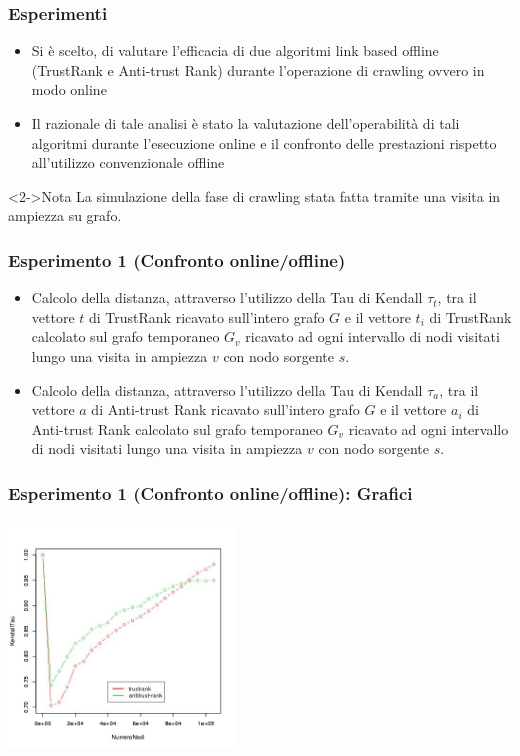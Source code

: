 \documentclass{beamer}
\begin{document}
\begin{frame}
  \frametitle{Esperimenti}
  \begin{itemize}
   \item Si è scelto, di valutare l’efficacia di due algoritmi link based offline (TrustRank e Anti-trust Rank) durante l’operazione di crawling ovvero in modo online
   \item Il razionale di tale analisi è stato la valutazione dell’operabilità di tali algoritmi durante l’esecuzione online e
il confronto delle prestazioni rispetto all’utilizzo convenzionale offline
  \end{itemize}
  \begin{block}<2->{Nota}
   La simulazione della fase di crawling  stata fatta tramite una visita in ampiezza su grafo.
  \end{block}
\end{frame}
\begin{frame}
\frametitle{Esperimento 1 {\tiny(Confronto online/offline)}}
\begin{itemize}
 \item<1-> Calcolo della distanza, attraverso l’utilizzo della Tau di Kendall \(\tau_t\), tra il vettore \(t\) di TrustRank ricavato sull’intero grafo \(G\) e il vettore \(t_i\) di TrustRank calcolato sul grafo temporaneo \(G_v\) ricavato ad ogni intervallo di nodi visitati lungo una visita in ampiezza \(v\) con nodo sorgente \(s\).
 \item<2-> Calcolo della distanza, attraverso l’utilizzo della Tau di Kendall \(\tau_a\), tra il vettore \(a\) di Anti-trust Rank ricavato sull’intero grafo \(G\) e il vettore \(a_i\) di Anti-trust Rank calcolato sul grafo temporaneo \(G_v\) ricavato ad ogni intervallo di nodi visitati lungo una visita in ampiezza \(v\) con nodo sorgente \(s\).
\end{itemize}
\end{frame}
\begin{frame}
\frametitle{Esperimento 1 {\tiny(Confronto online/offline)}: Grafici}
\begin{center}
 \includegraphics[height=6cm]{immagini/test1/coplotTrustAnti_62}
\end{center}
\end{frame}
\end{document}
